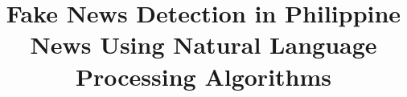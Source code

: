 \documentclass[12pt]{cspcccsthesis}
\title{Fake News Detection in Philippine News Using Natural Language Processing Algorithms}
\begin{document}

\begin{frontmatter}
    
    
    \makeAbstract
    \makeTOC
    \makeListOfTables
    \makeListOfFigures
\end{frontmatter}

\begin{thesisbody}
    
    
    
    
    
    \makeBibliography
    
    
\end{thesisbody}
\end{document}

